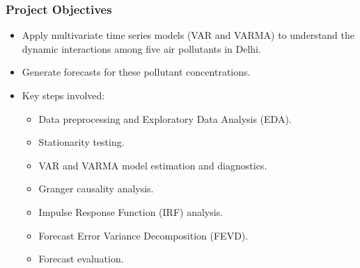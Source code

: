 \documentclass[svgnames, 12pt]{beamer}
\begin{document}
\begin{frame}
    \frametitle{Project Objectives}
    \begin{itemize}
        \item Apply multivariate time series models (VAR and VARMA) to understand the dynamic interactions among five air pollutants in Delhi.
        \item Generate forecasts for these pollutant concentrations.
        \item Key steps involved:
        \begin{itemize}
            \item Data preprocessing and Exploratory Data Analysis (EDA).
            \item Stationarity testing.
            \item VAR and VARMA model estimation and diagnostics.
            \item Granger causality analysis.
            \item Impulse Response Function (IRF) analysis.
            \item Forecast Error Variance Decomposition (FEVD).
            \item Forecast evaluation.
        \end{itemize}
    \end{itemize}
\end{frame}

\end{document}
